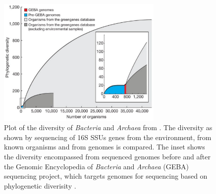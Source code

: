 \begin{figure}[H]
\centering
\includegraphics[width=80mm]{conc_figures/prok_diversity.pdf}
\caption[Plot of the diversity of \emph{Bacteria} and \emph{Archaea} from \citet{Wu2009}]{ Plot of the diversity of \emph{Bacteria} and \emph{Archaea} from \citet{Wu2009}. 
The diversity as shown by sequencing of 16S \acp{SSU} genes from the environment, from known organisms and from genomes is compared.
The inset shows the diversity encompassed from sequenced genomes before and after the Genomic Encyclopedia of \emph{Bacteria} and \emph{Archaea} (GEBA) sequencing project, which targets genomes for sequencing based on phylogenetic diverisity \cite{Wu2009}.
}
\label{fig:prok_diversity}

\end{figure}
